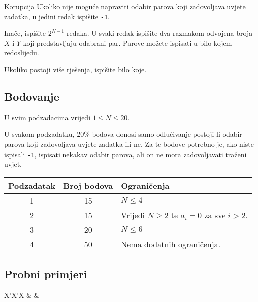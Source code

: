 \begin{statement}[
  problempoints=100,
  timelimit=1 sekunda,
  memorylimit= 512 MiB,
]{Korupcija}
Ukoliko nije moguće napraviti odabir parova koji zadovoljava uvjete zadatka, 
u jedini redak ispišite \texttt{-1}. 

Inače, ispišite $2^{N-1}$ redaka. U svaki redak ispišite dva razmakom odvojena broja $X$ i $Y$ 
koji predstavljaju odabrani par. Parove možete ispisati u bilo kojem redoslijedu.

Ukoliko postoji više rješenja, ispišite bilo koje. 

\subsection*{Bodovanje}

U svim podzadacima vrijedi $1 \leq N \leq 20$. 

U svakom podzadatku, 20\% bodova donosi samo odlučivanje
postoji li odabir parova koji zadovoljava uvjete zadatka ili ne.  
Za te bodove potrebno je, ako niste ispisali \texttt{-1}, ispisati nekakav 
odabir parova, ali on ne mora zadovoljavati traženi uvjet.


{\renewcommand{\arraystretch}{1.4}
  \setlength{\tabcolsep}{6pt}
  \begin{tabular}{ccl}
   Podzadatak & Broj bodova & Ograničenja \\ \midrule
    1 & 15 & $N \leq 4$ \\
    2 & 15 & Vrijedi $N \geq 2$ te $a_i = 0$ za sve $i > 2$. \\
    3 & 20 & $N \leq 6$\\
    4 & 50 & Nema dodatnih ograničenja. \\
\end{tabular}}

\subsection*{Probni primjeri}
\begin{tabularx}{\textwidth}{X'X'X}
 &
 &
\end{tabularx}

\end{statement}

